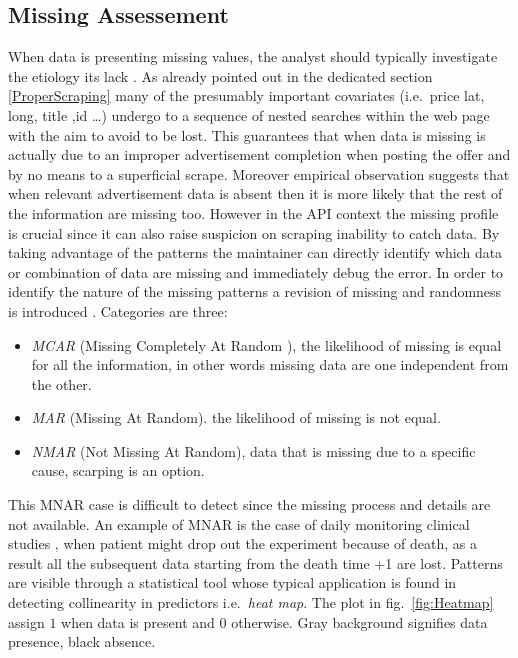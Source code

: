 \documentclass[
  12pt,
  a4paper,
  oneside]{book}
\providecommand{\tightlist}{%
  \setlength{\itemsep}{0pt}\setlength{\parskip}{0pt}}
\theoremstyle{definition}
\theoremstyle{definition}
\theoremstyle{definition}
\theoremstyle{remark}
\begin{document}
\hypertarget{missing-assessement}{%
\subsection{Missing Assessement}\label{missing-assessement}}

When data is presenting missing values, the analyst should typically investigate the etiology its lack \citep{Kuhn}. As already pointed out in the dedicated section \ref{ProperScraping} many of the presumably important covariates (i.e.~price lat, long, title ,id \ldots) undergo to a sequence of nested searches within the web page with the aim to avoid to be lost. This guarantees that when data is missing is actually due to an improper advertisement completion when posting the offer and by no means to a superficial scrape. Moreover empirical observation suggests that when relevant advertisement data is absent then it is more likely that the rest of the information are missing too.
However in the API context the missing profile is crucial since it can also raise suspicion on scraping inability to catch data. By taking advantage of the patterns the maintainer can directly identify which data or combination of data are missing and immediately debug the error. In order to identify the nature of the missing patterns a revision of missing and randomness is introduced \citep{Little}.
Categories are three:

\begin{itemize}
\tightlist
\item
  \emph{MCAR} (Missing Completely At Random ), the likelihood of missing is equal for all the information, in other words missing data are one independent from the other.
\item
  \emph{MAR} (Missing At Random). the likelihood of missing is not equal.
\item
  \emph{NMAR} (Not Missing At Random), data that is missing due to a specific cause, scarping is an option.
\end{itemize}

This MNAR case is difficult to detect since the missing process and details are not available. An example of MNAR is the case of daily monitoring clinical studies \citeyearpar{Kuhn}, when patient might drop out the experiment because of death, as a result all the subsequent data starting from the death time +1 are lost.
Patterns are visible through a statistical tool whose typical application is found in detecting collinearity in predictors i.e.~\emph{heat map}. The plot in fig.~\ref{fig:Heatmap} assign \(1\) when data is present and \(0\) otherwise. Gray background signifies data presence, black absence.
\end{document}
